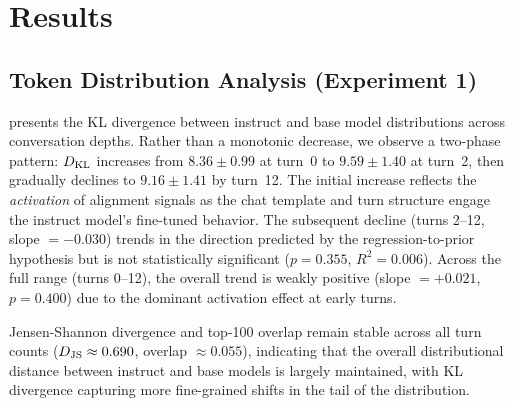 \section{Results}
\label{sec:results}

\subsection{Token Distribution Analysis (Experiment 1)}
\label{sec:results_exp1}

 presents the KL divergence between instruct and base model distributions across conversation depths. Rather than a monotonic decrease, we observe a two-phase pattern: $D_{\mathrm{KL}}$ increases from $8.36 \pm 0.99$ at turn~0 to $9.59 \pm 1.40$ at turn~2, then gradually declines to $9.16 \pm 1.41$ by turn~12. The initial increase reflects the \emph{activation} of alignment signals as the chat template and turn structure engage the instruct model's fine-tuned behavior. The subsequent decline (turns 2--12, slope $= -0.030$) trends in the direction predicted by the regression-to-prior hypothesis but is not statistically significant ($p = 0.355$, $R^2 = 0.006$). Across the full range (turns 0--12), the overall trend is weakly positive (slope $= +0.021$, $p = 0.400$) due to the dominant activation effect at early turns.

Jensen-Shannon divergence and top-100 overlap remain stable across all turn counts ($D_{\mathrm{JS}} \approx 0.690$, overlap $\approx 0.055$), indicating that the overall distributional distance between instruct and base models is largely maintained, with KL divergence capturing more fine-grained shifts in the tail of the distribution.

